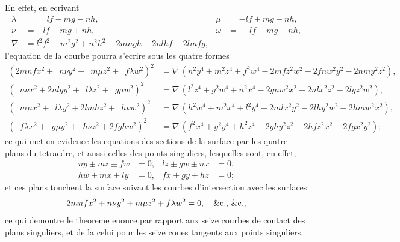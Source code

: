 \documentclass[12pt,a4paper]{article}
\theoremstyle{plain}
\begin{document}
En effet, en ecrivant
\begin{align*}
\lambda &= \phantom{-}lf - mg - nh, & \mu &= -lf + mg - nh, \\
\nu &= -lf - mg + nh, & \omega &= \phantom{-}lf + mg + nh, \\
\nabla &= l^2f^2 + m^2g^2 + n^2h^2 - 2mngh - 2nlhf - 2lmfg,
\end{align*}
l'equation de la courbe pourra s'ecrire sous les quatre formes
{\footnotesize
\begin{align*}
(2mnfx^2 + \phantom{2}n\nu y^2 + \phantom{2}m\mu z^2 + \phantom{2}f\lambda w^2)^2 &= \nabla\,(n^2y^4 + m^2z^4 + f^2w^4 - 2mfz^2w^2 - 2fnw^2y^2 - 2nmy^2z^2), \\
(\phantom{2}n\nu x^2 + 2nlgy^2 + \phantom{2}l\lambda z^2 + \phantom{2}g\mu w^2)^2 &= \nabla\,(l^2z^4 + g^2w^4 + n^2x^4 - 2gnw^2x^2 - 2nlx^2z^2 - 2lgz^2w^2), \\
(\phantom{2}m\mu x^2 + \phantom{2}l\lambda y^2 + 2lmhz^2 + \phantom{2}h\nu w^2)^2 &= \nabla\,(h^2w^4 + m^2x^4 + l^2y^4 - 2mlx^2y^2 - 2lhy^2w^2 - 2hmw^2x^2), \\
(\phantom{2}f\lambda x^2 + \phantom{2}g\mu y^2 + \phantom{2}h\nu z^2 + 2fghw^2)^2 &= \nabla\,(f^2x^4 + g^2y^4 + h^2z^4 - 2ghy^2z^2 - 2hfz^2x^2 - 2fgx^2y^2);
\end{align*}
}
ce qui met en evidence les equations des sections de la surface par les quatre plans du tetraedre, et aussi celles des points singuliers, lesquelles sont, en effet,
\begin{align*}
ny \pm mz \pm fw &= 0, & lz \pm gw \pm nx &= 0, \\
hw \pm mx \pm ly &= 0, & fx \pm gy \pm hz &= 0;
\end{align*}
et ces plans touchent la surface suivant les courbes d'intersection avec les surfaces
\[
2mnfx^2 + n\nu y^2 + m\mu z^2 + f\lambda w^2 = 0, \quad \&\text{c., \&\text{c.},}
\]
ce qui demontre le theoreme enonce par rapport aux seize courbes de contact des plans singuliers, et de la celui pour les seize cones tangents aux points singuliers.
\end{document}
